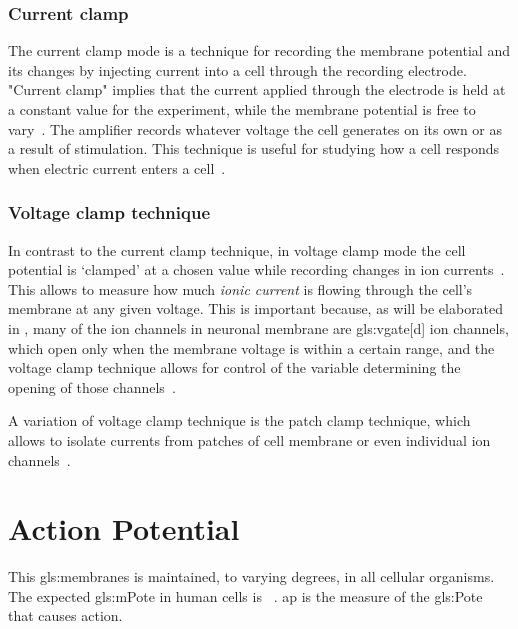 \documentclass[class={myRUCProject}, crop=false]{standalone}
\begin{document}
\subsubsection{Current clamp}\label{sec:Cclamp}

The current clamp mode is a technique for recording the membrane potential and its changes by injecting current into a cell through the recording electrode.  "Current clamp" implies that the current applied through the electrode is held at a constant value for the experiment, while the membrane potential is free to vary~\cite{Hammond2015ch4}. The amplifier records whatever voltage the cell generates on its own or as a result of stimulation. 
This technique is useful for studying how a cell responds when electric current enters a cell~\cite{Hammond2015ch4}.

\subsubsection{Voltage clamp technique}\label{sec:Vclamp}
 
In contrast to the current clamp technique, in voltage clamp mode the cell potential is `clamped' at a chosen value while recording changes in ion currents~\cite{Hammond2015ch4}. 
This allows to measure how much \textit{ionic current} is flowing through the cell's membrane at any given voltage. 
This is important because, as will be elaborated in , many of the ion channels in neuronal membrane are \gls{gls:vgate}[d] ion channels, which open only when the membrane voltage is within a certain range, and the voltage clamp technique allows for control of the variable determining the opening of those channels~\cite{Hammond2015ch4}.

A variation of  voltage clamp technique is the patch clamp technique, which allows to isolate currents from patches of cell membrane or even individual ion channels~\cite{Hammond2015ch4}.%

\section{Action Potential}\label{sec:ap}
This \glspl{gls:membrane} is maintained, to varying degrees, in all cellular organisms. 
The expected \gls{gls:mPote} in human cells is ~\cite{Hammond2015ch4}.
\gls{ap} is the measure of the \gls{gls:Pote} that causes action.
\end{document}
